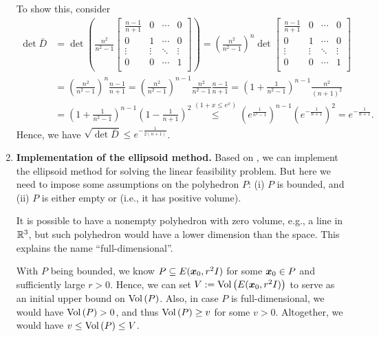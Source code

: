 \begin{enumerate}
\begin{pf}
To show this, consider
\begin{align*}
\det\bar{D}&=\det\left(\frac{n^{2}}{n^{2}-1}
\begin{bmatrix}\frac{n-1}{n+1}&0&\cdots&0\\
0&1&\cdots&0\\
\vdots&\vdots&\ddots&\vdots \\
0&0&\cdots&1\\
\end{bmatrix}\right)
=\left(\frac{n^{2}}{n^{2}-1}\right)^{n}\det
\begin{bmatrix}\frac{n-1}{n+1}&0&\cdots&0\\
0&1&\cdots&0\\
\vdots&\vdots&\ddots&\vdots \\
0&0&\cdots&1\\
\end{bmatrix} \\
&=\left(\frac{n^{2}}{n^{2}-1}\right)^{n}\frac{n-1}{n+1}
=\left(\frac{n^{2}}{n^{2}-1}\right)^{n-1}\frac{n^{2}}{n^{2}-1}\frac{n-1}{n+1}
=\left(1+\frac{1}{n^{2}-1}\right)^{n-1}\frac{n^{2}}{(n+1)^{2}} \\
&=\left(1+\frac{1}{n^{2}-1}\right)^{n-1}\left(1-\frac{1}{n+1}\right)^{2}
\overset{(1+x\le e^{x})}{\le}
\left(e^{\frac{1}{n^{2}-1}}\right)^{n-1}\left(e^{-\frac{1}{n+1}}\right)^{2}
=e^{-\frac{1}{n+1}}.
\end{align*}
Hence, we have \(\sqrt{\det \bar{D}}\le e^{-\frac{1}{2(n+1)}}\).
\end{pf}
\item \label{it:ellip-method-implement} \textbf{Implementation of the ellipsoid
method.} Based on , we can implement the
ellipsoid method for solving the linear feasibility problem. But here we need
to impose some assumptions on the polyhedron \(P\): (i) \(P\) is bounded, and
(ii) \(P\) is either empty or  (i.e., it has positive
volume).
\begin{note}
It is possible to have a nonempty polyhedron with zero volume, e.g., a line in
\(\mathbb{R}^3\), but such polyhedron would have a lower dimension than the space. This
explains the name ``full-dimensional''.
\end{note}

With \(P\) being bounded, we know \(P\subseteq E(\bm{x}_0,r^{2}I)\) for some
\(\bm{x}_0\in P\) and sufficiently large \(r>0\). Hence, we can set
\(V:=\operatorname{Vol}\left(E(\bm{x}_0,r^{2}I)\right)\) to serve as an initial upper bound on
\(\operatorname{Vol}\left(P\right)\).  Also, in case \(P\) is full-dimensional, we would have
\(\operatorname{Vol}\left(P\right)>0\), and thus \(\operatorname{Vol}\left(P\right)\ge v\) for some \(v>0\). Altogether, we would
have \(v\le \operatorname{Vol}\left(P\right)\le V\).


\end{enumerate}
